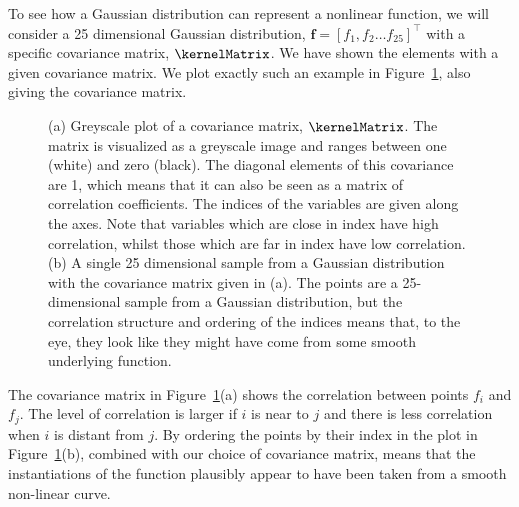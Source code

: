 To see how a Gaussian distribution can represent a nonlinear function,
we will consider a 25 dimensional Gaussian distribution,
$\mathbf{f=}\left[f_{1},f_{2}\dots f_{25}\right]^{\top}$ with a
specific covariance matrix, $\kernelMatrix$. We have shown the elements
with a given covariance matrix. We plot exactly such an example in
Figure~\ref{cap:demGPSample}, also giving the covariance matrix. %
\begin{figure}[htb]
  \hfill
  \caption{(a) Greyscale plot of a covariance matrix,
    $\kernelMatrix$. The matrix is visualized as a greyscale image and
    ranges between one (white) and zero (black). The diagonal elements
    of this covariance are 1, which means that it can also be seen as
    a matrix of correlation coefficients. The indices of the variables
    are given along the axes. Note that variables which are close in
    index have high correlation, whilst those which are far in index
    have low correlation. (b) A single 25 dimensional sample from a
    Gaussian distribution with the covariance matrix given in (a). The
    points are a 25-dimensional sample from a Gaussian distribution,
    but the correlation structure and ordering of the indices means
    that, to the eye, they look like they might have come from some
    smooth underlying function. \label{cap:demGPSample}}

\end{figure}


The covariance matrix in Figure~\ref{cap:demGPSample}(a) shows the
correlation between points $f_{i}$ and $f_{j}$. The level of
correlation is larger if $i$ is near to $j$ and there is less
correlation when $i$ is distant from $j$. By ordering the points by
their index in the plot in Figure~\ref{cap:demGPSample}(b), combined
with our choice of covariance matrix, means that the instantiations of
the function plausibly appear to have been taken from a smooth
non-linear curve.


